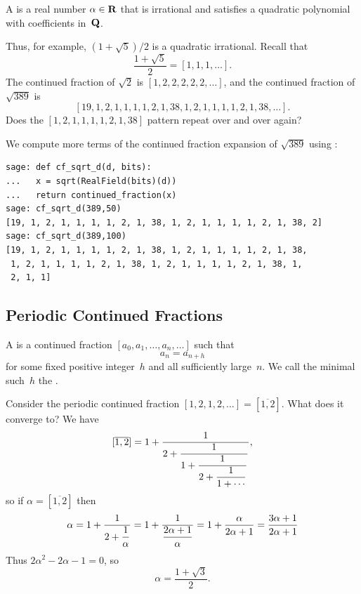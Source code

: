 \begin{definition}
A  is a real number $\alpha\in\mathbf{R}$
that is irrational and satisfies a quadratic polynomial
with coefficients in~$\mathbf{Q}$.
\end{definition}
Thus, for example, $(1+\sqrt{5})/2$ is a quadratic irrational.
Recall that
$$
  \frac{1+\sqrt{5}}{2} = [1,1,1,\ldots].
$$
The continued fraction of $\sqrt{2}$
is $[1,2,2,2,2,2,\ldots]$, and
the continued fraction of $\sqrt{389}$ is
$$
   [19,1,2,1, 1, 1, 1, 2, 1, 38, 1, 2, 1, 1, 1, 1, 2, 1, 38,\ldots].$$
Does the $[1,2,1, 1, 1, 1, 2, 1, 38]$ pattern repeat over and over again?
\begin{sg}
We compute more terms of the continued fraction expansion of $\sqrt{389}$
using \sage:
\begin{verbatim}
sage: def cf_sqrt_d(d, bits):
...   x = sqrt(RealField(bits)(d))
...   return continued_fraction(x)
sage: cf_sqrt_d(389,50)
[19, 1, 2, 1, 1, 1, 1, 2, 1, 38, 1, 2, 1, 1, 1, 1, 2, 1, 38, 2]
sage: cf_sqrt_d(389,100)
[19, 1, 2, 1, 1, 1, 1, 2, 1, 38, 1, 2, 1, 1, 1, 1, 2, 1, 38,
 1, 2, 1, 1, 1, 1, 2, 1, 38, 1, 2, 1, 1, 1, 1, 2, 1, 38, 1,
 2, 1, 1]
\end{verbatim}
\end{sg}

\subsection{Periodic Continued Fractions}
\begin{definition}
A  is a continued
fraction $[a_0, a_1, \ldots, a_n, \ldots]$ such that
$$
  a_n = a_{n+h}
$$
for some fixed positive integer~$h$ and all sufficiently large~$n$.
We call the minimal such~$h$ the .
\end{definition}

\begin{example}\label{ex:cfrat}
Consider the periodic continued fraction $[1,2,1,2,\ldots] = [\overline{1,2}]$.
 What does it converge to?  We have
$$[\overline{1,2}] = 1+\frac{1}{\displaystyle 2+\frac{1}{\displaystyle 1+\frac{1}{\displaystyle 2+ \frac{1}{\displaystyle 1+\cdots}}}},$$
so if $\alpha=[\overline{1,2}]$ then
$$
  \alpha = 1 + \frac{1}{2+\displaystyle\frac{1}{\alpha}}
   = 1 + \frac{1}{\displaystyle\frac{2\alpha+1}{\alpha}}
   = 1 + \frac{\alpha}{2\alpha+1}
   = \frac{3\alpha+1}{2\alpha+1}
$$
Thus $2\alpha^2 -2\alpha-1 = 0$, so
$$
\alpha = \frac{1+\sqrt{3}}{2}.
$$
\end{example}

